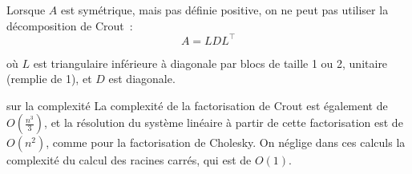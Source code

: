 Lorsque $A$ est symétrique, mais pas définie positive, on ne peut pas utiliser la décomposition de Crout~:
$$A = L D L^\top$$

où $L$ est triangulaire inférieure à diagonale par blocs de taille 1 ou 2, unitaire (remplie de 1), et $D$ est diagonale.\\


\begin{remarque}{}{sur la complexité}
    La complexité de la factorisation de Crout est également de $O(\frac{n^3}{3})$, et la résolution du système linéaire à partir de cette factorisation est de $O(n^2)$, comme pour la factorisation de Cholesky. On néglige dans ces calculs la complexité du calcul des racines carrés, qui est de $O(1)$.
\end{remarque}